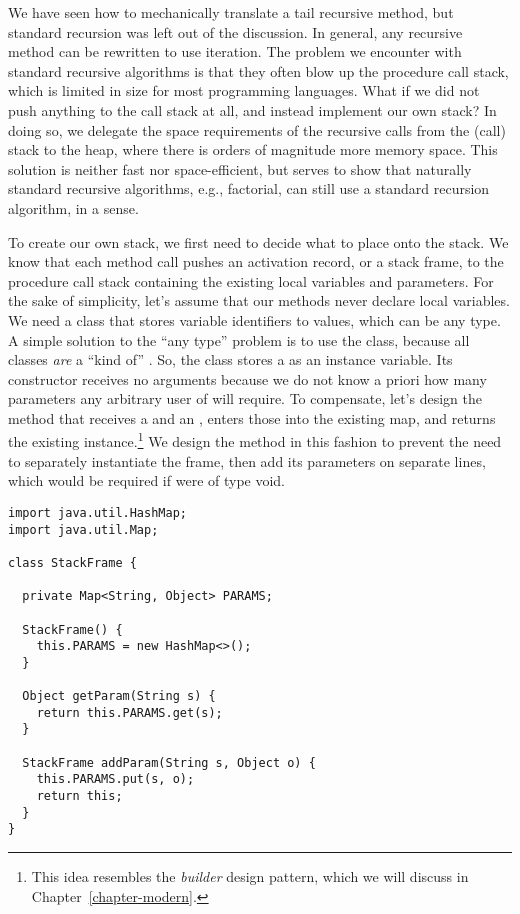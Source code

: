 We have seen how to mechanically translate a tail recursive method, but standard recursion was left out of the discussion. 
In general, any recursive method can be rewritten to use iteration. 
The problem we encounter with standard recursive algorithms is that they often blow up the procedure call stack, which is limited in size for most programming languages. 
What if we did not push anything to the call stack at all, and instead implement our own stack? 
In doing so, we delegate the space requirements of the recursive calls from the (call) stack to the heap, where there is orders of magnitude more memory space. This solution is neither fast nor space-efficient, but serves to show that naturally standard recursive algorithms, e.g., factorial, can still use a standard recursion algorithm, in a sense.

To create our own stack, we first need to decide what to place onto the stack. 
We know that each method call pushes an activation record, or a stack frame, to the procedure call stack containing the existing local variables and parameters. 
For the sake of simplicity, let's assume that our methods never declare local variables. 
We need a class that stores variable identifiers to values, which can be any type. 
A simple solution to the ``any type'' problem is to use the  class, because all classes \emph{are} a ``kind of'' . 
So, the  class stores a  as an instance variable. 
Its constructor receives no arguments because we do not know a priori how many parameters any arbitrary user of  will require. 
To compensate, let's design the  method that receives a  and an , enters those into the existing map, and returns the existing instance.\footnote{This idea resembles the \emph{builder} design pattern, which we will discuss in Chapter~\ref{chapter-modern}.} We design the method in this fashion to prevent the need to separately instantiate the frame, then add its parameters on separate lines, which would be required if  were of type void.

\begin{lstlisting}[language=MyJava]
import java.util.HashMap;
import java.util.Map;

class StackFrame {

  private Map<String, Object> PARAMS;

  StackFrame() { 
    this.PARAMS = new HashMap<>(); 
  }

  Object getParam(String s) { 
    return this.PARAMS.get(s); 
  }

  StackFrame addParam(String s, Object o) {
    this.PARAMS.put(s, o);
    return this;
  }
}
\end{lstlisting}

